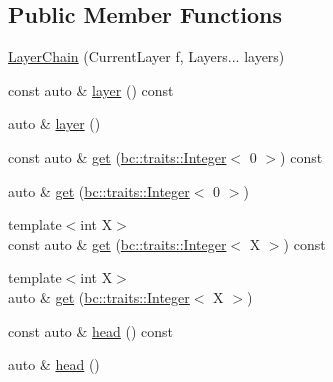 \subsection*{Public Member Functions}
\begin{DoxyCompactItemize}
\item 
\hyperlink{structbc_1_1nn_1_1LayerChain_3_01Index_00_01Derived_00_01CurrentLayer_00_01Layers_8_8_8_01_4_a431c5798ec952b71784d60a312a8ff4b}{Layer\+Chain} (Current\+Layer f, Layers... layers)
\item 
const auto \& \hyperlink{structbc_1_1nn_1_1LayerChain_3_01Index_00_01Derived_00_01CurrentLayer_00_01Layers_8_8_8_01_4_a4815d0846ee12d17808ef573d9e3e339}{layer} () const
\item 
auto \& \hyperlink{structbc_1_1nn_1_1LayerChain_3_01Index_00_01Derived_00_01CurrentLayer_00_01Layers_8_8_8_01_4_adf3ed0dba6a47b138760c73d3d881c6c}{layer} ()
\item 
const auto \& \hyperlink{structbc_1_1nn_1_1LayerChain_3_01Index_00_01Derived_00_01CurrentLayer_00_01Layers_8_8_8_01_4_a8980d10416e62e247bf2f8b24350bb3c}{get} (\hyperlink{structbc_1_1traits_1_1Integer}{bc\+::traits\+::\+Integer}$<$ 0 $>$) const
\item 
auto \& \hyperlink{structbc_1_1nn_1_1LayerChain_3_01Index_00_01Derived_00_01CurrentLayer_00_01Layers_8_8_8_01_4_aeb9d0e9706faf1d713a99b1f7c6d604a}{get} (\hyperlink{structbc_1_1traits_1_1Integer}{bc\+::traits\+::\+Integer}$<$ 0 $>$)
\item 
{\footnotesize template$<$int X$>$ }\\const auto \& \hyperlink{structbc_1_1nn_1_1LayerChain_3_01Index_00_01Derived_00_01CurrentLayer_00_01Layers_8_8_8_01_4_a699e8162b5fbf241e20025a4e04966ce}{get} (\hyperlink{structbc_1_1traits_1_1Integer}{bc\+::traits\+::\+Integer}$<$ X $>$) const
\item 
{\footnotesize template$<$int X$>$ }\\auto \& \hyperlink{structbc_1_1nn_1_1LayerChain_3_01Index_00_01Derived_00_01CurrentLayer_00_01Layers_8_8_8_01_4_aa8654e4508823c73ae2cd6fb38049044}{get} (\hyperlink{structbc_1_1traits_1_1Integer}{bc\+::traits\+::\+Integer}$<$ X $>$)
\item 
const auto \& \hyperlink{structbc_1_1nn_1_1LayerChain_3_01Index_00_01Derived_00_01CurrentLayer_00_01Layers_8_8_8_01_4_a2a2418bc628ec75a0be429f6a984fe57}{head} () const
\item 
auto \& \hyperlink{structbc_1_1nn_1_1LayerChain_3_01Index_00_01Derived_00_01CurrentLayer_00_01Layers_8_8_8_01_4_a98ebd61e4985d5227e4cc09313654e27}{head} ()

\end{DoxyCompactItemize}
